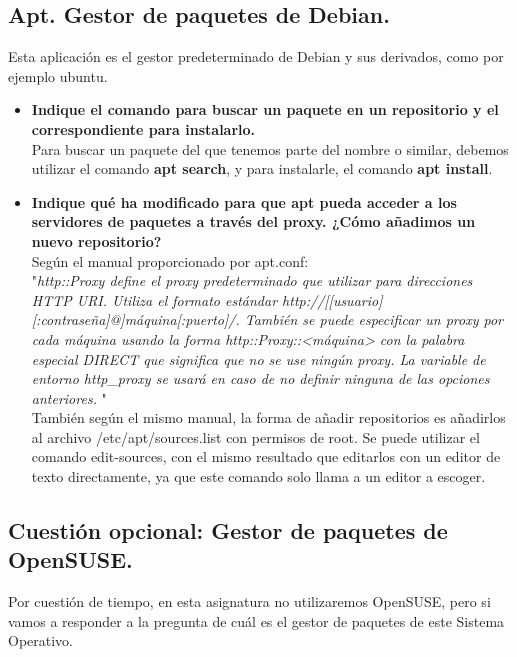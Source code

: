 \subsection{Apt. Gestor de paquetes de Debian.}
Esta aplicación es el gestor predeterminado de Debian y sus derivados, como por ejemplo ubuntu.
\begin{itemize}
	\item \textbf{Indique el comando para buscar un paquete en un repositorio y el
		correspondiente para instalarlo.}\\
	Para buscar un paquete del que tenemos parte del nombre o similar, debemos utilizar el comando \textbf{apt search}, y para instalarle, el comando \textbf{apt install}.\cite{b1}
	
	
	 \item \textbf{Indique qué ha modificado para que apt pueda acceder a los servidores de paquetes a través del proxy. ¿Cómo añadimos un nuevo repositorio?}\\
	 Según el manual proporcionado por apt.conf:\\
	 
	 "\textit{http::Proxy define el proxy predeterminado que utilizar para direcciones HTTP URI. Utiliza el formato estándar
	 	http://[[usuario][:contraseña]@]máquina[:puerto]/. También se puede especificar un proxy por cada máquina usando la forma
	 	http::Proxy::<máquina> con la palabra especial DIRECT que significa que no se use ningún proxy. La variable de entorno http\_proxy
	 	se usará en caso de no definir ninguna de las opciones anteriores.
	 }"\cite{b2}\\
	 
	 También según el mismo manual, la forma de añadir repositorios es añadirlos al archivo /etc/apt/sources.list con permisos de root. Se puede utilizar el comando edit-sources, con el mismo resultado que editarlos con un editor de texto directamente, ya que este comando solo llama a un editor a escoger\cite{b1}.
	 
	 
	 
\end{itemize}

\subsection{Cuestión opcional: Gestor de paquetes de OpenSUSE.}
Por cuestión de tiempo, en esta asignatura no utilizaremos OpenSUSE, pero si vamos a responder a la pregunta de cuál es el gestor de paquetes de este Sistema Operativo.\\

